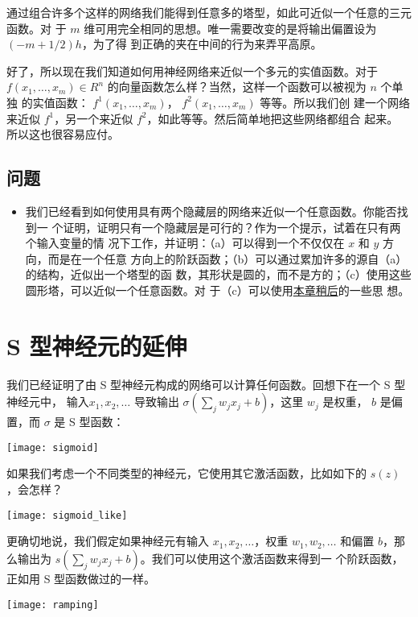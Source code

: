 通过组合许多个这样的网络我们能得到任意多的塔型，如此可近似一个任意的三元函数。对
于 $m$ 维可用完全相同的思想。唯一需要改变的是将输出偏置设为 $(-m+1/2)h$，为了得
到正确的夹在中间的行为来弄平高原。%

好了，所以现在我们知道如何用神经网络来近似一个多元的实值函数。对于 $f(x_1,
\ldots, x_m) \in R^n$ 的向量函数怎么样？当然，这样一个函数可以被视为 $n$ 个单独
的实值函数： $f^1(x_1, \ldots, x_m)$， $f^2(x_1, \ldots, x_m)$ 等等。所以我们创
建一个网络来近似 $f^1$，另一个来近似 $f^2$，如此等等。然后简单地把这些网络都组合
起来。 所以这也很容易应付。

\subsection*{问题}

\begin{itemize}
  \item 我们已经看到如何使用具有两个隐藏层的网络来近似一个任意函数。你能否找到一
    个证明，证明只有一个隐藏层是可行的？作为一个提示，试着在只有两个输入变量的情
    况下工作，并证明：（a）可以得到一个不仅仅在 $x$ 和 $y$ 方向，而是在一个任意
    方向上的阶跃函数；（b）可以通过累加许多的源自（a）的结构，近似出一个塔型的函
    数，其形状是圆的，而不是方的；（c）使用这些圆形塔，可以近似一个任意函数。对
    于（c）可以使用\hyperref[sec:fixing_up_the_step_functions]{本章稍后}的一些思
    想。
\end{itemize}

\section{S 型神经元的延伸}
\label{sec:extension_beyond_sigmoid_neurons}

我们已经证明了由 S 型神经元构成的网络可以计算任何函数。回想下在一个 S 型神经元中，
输入$x_1, x_2, \ldots$ 导致输出 $\sigma(\sum_j w_j x_j + b)$，这里 $w_j$ 是权重，
$b$ 是偏置，而 $\sigma$ 是 S 型函数：
\begin{center}
  \texttt{[image: sigmoid]}
\end{center} 

如果我们考虑一个不同类型的神经元，它使用其它激活函数，比如如下的 $s(z)$，会怎样？
\begin{center}
  \texttt{[image: sigmoid\_like]}
\end{center} 

更确切地说，我们假定如果神经元有输入 $x_1, x_2, \ldots$，权重 $w_1, w_2, \ldots$
和偏置 $b$，那么输出为 $s(\sum_j w_j x_j + b)$。我们可以使用这个激活函数来得到一
个阶跃函数，正如用 S 型函数做过的一样。
\begin{center}
  \texttt{[image: ramping]}
\end{center}

